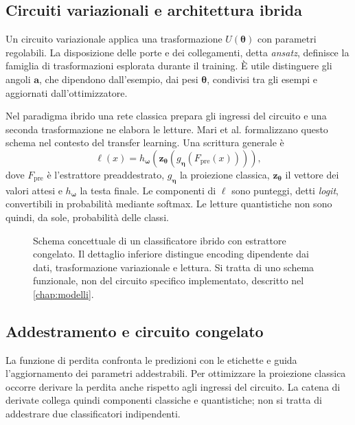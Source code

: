 \subsection{Circuiti variazionali e architettura ibrida}

Un circuito variazionale applica una trasformazione
\(U(\boldsymbol\theta)\) con parametri regolabili. La disposizione
delle porte e dei collegamenti, detta \emph{ansatz}, definisce la famiglia
di trasformazioni esplorata durante il training. È utile distinguere
gli angoli \(\boldsymbol a\), che dipendono dall'esempio, dai pesi
\(\boldsymbol\theta\), condivisi tra gli esempi e aggiornati
dall'ottimizzatore.

Nel paradigma ibrido una rete classica prepara gli ingressi del circuito
e una seconda trasformazione ne elabora le letture. Mari et al.
\cite{mari2020transfer} formalizzano questo schema nel contesto del
transfer learning. Una scrittura generale è
\begin{equation}
 \boldsymbol\ell(x)=h_{\boldsymbol\omega}
 \left(\boldsymbol z_{\boldsymbol\theta}
 \left(g_{\boldsymbol\eta}(F_{\mathrm{pre}}(x))\right)\right),
\end{equation}
dove \(F_{\mathrm{pre}}\) è l'estrattore preaddestrato,
\(g_{\boldsymbol\eta}\) la proiezione classica,
\(\boldsymbol z_{\boldsymbol\theta}\) il vettore dei valori attesi e
\(h_{\boldsymbol\omega}\) la testa finale. Le componenti di
\(\boldsymbol\ell\) sono punteggi, detti \emph{logit}, convertibili
in probabilità mediante softmax. Le letture quantistiche non sono
quindi, da sole, probabilità delle classi.

\begin{figure}[tbp]
\centering
\resizebox{\textwidth}{!}{}
\caption{Schema concettuale di un classificatore ibrido con estrattore
congelato. Il dettaglio inferiore distingue encoding dipendente dai dati,
trasformazione variazionale e lettura. Si tratta di uno schema funzionale,
non del circuito specifico implementato, descritto nel \cref{chap:modelli}.}
\label{fig:fond-ibrido}
\end{figure}

\subsection{Addestramento e circuito congelato}

La funzione di perdita confronta le predizioni con le etichette e guida
l'aggiornamento dei parametri addestrabili. Per ottimizzare la proiezione
classica occorre derivare la perdita anche rispetto agli ingressi del
circuito. La catena di derivate collega quindi componenti classiche e
quantistiche; non si tratta di addestrare due classificatori indipendenti.

